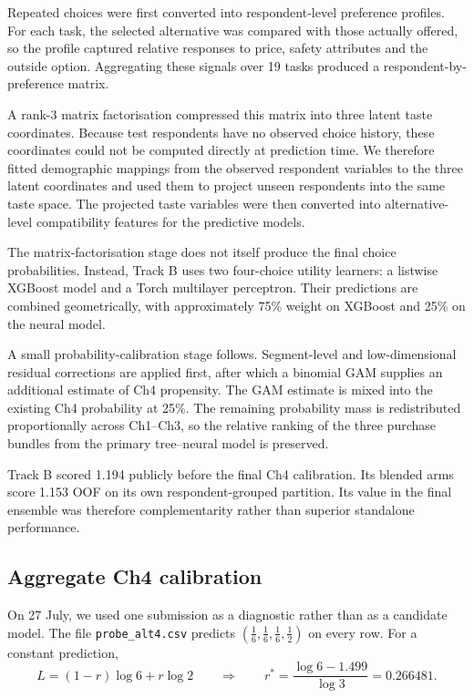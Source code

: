 \documentclass[11pt]{article}
\begin{document}
Repeated choices were first converted into respondent-level preference profiles. For each task, the selected alternative was compared with those actually offered, so
the profile captured relative responses to price, safety attributes and the outside option.
Aggregating these signals over 19 tasks produced a respondent-by-preference matrix.

A rank-3 matrix factorisation compressed this matrix into three latent taste coordinates.
Because test respondents have no observed choice history, these coordinates could not be
computed directly at prediction time. We therefore fitted demographic mappings from the
observed respondent variables to the three latent coordinates and used them to project
unseen respondents into the same taste space. The projected taste variables were then
converted into alternative-level compatibility features for the predictive models.

The matrix-factorisation stage does not itself produce the final choice probabilities.
Instead, Track B uses two four-choice utility learners: a listwise XGBoost model and a
Torch multilayer perceptron. Their predictions are combined geometrically, with
approximately 75\% weight on XGBoost and 25\% on the neural model.

A small probability-calibration stage follows. Segment-level and low-dimensional residual
corrections are applied first, after which a binomial GAM supplies an additional estimate
of Ch4 propensity. The GAM estimate is mixed into the existing Ch4 probability at 25\%.
The remaining probability mass is redistributed proportionally across Ch1--Ch3, so the
relative ranking of the three purchase bundles from the primary tree--neural model is
preserved.

Track B scored 1.194 publicly before the final Ch4 calibration. Its blended arms score
1.153 OOF on its own respondent-grouped partition. Its value in the final ensemble was therefore complementarity rather than superior
standalone performance.

\subsection{Aggregate Ch4 calibration}\label{sec:probe}

On 27 July, we used one submission as a diagnostic rather than as a candidate model. The
file \texttt{probe\_alt4.csv} predicts
$(\tfrac16,\tfrac16,\tfrac16,\tfrac12)$ on every row. For a constant prediction,
\[
L=(1-r)\log 6+r\log 2
\qquad\Longrightarrow\qquad
r^{*}=\frac{\log 6-1.499}{\log 3}=0.266481.
\]
\end{document}
